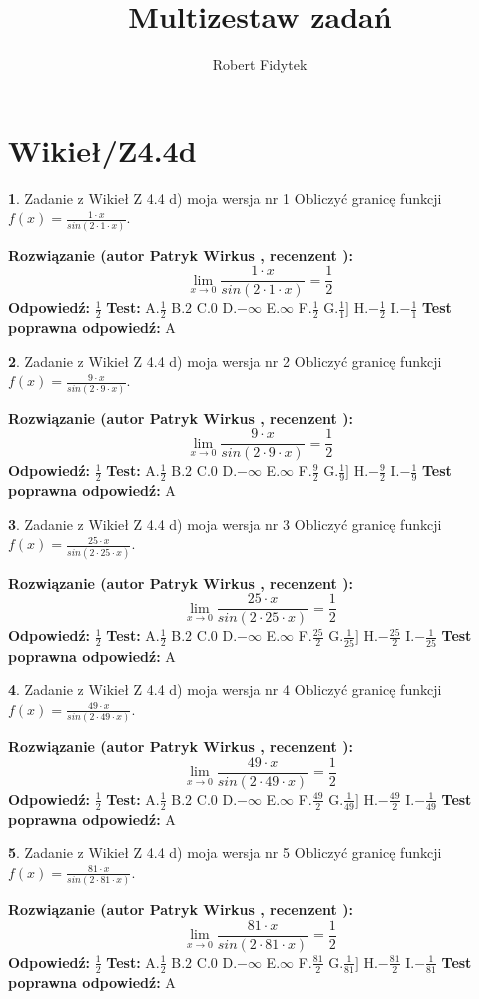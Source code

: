\documentclass[12pt, a4paper]{article}
\title{Multizestaw zadań}
\author{Robert Fidytek}
\date{}
\theoremstyle{definition} %
\newtheorem{zad}{}
\newcommand{\kategoria}[1]{\section{#1}}
\newcommand{\zadStart}[1]{\begin{zad}#1\newline}
\newcommand{\zadStop}{\end{zad}}
\newcommand{\rozwStart}[2]{\noindent \textbf{Rozwiązanie (autor #1 , recenzent #2): }\newline}
\newcommand{\rozwStop}{\newline}
\newcommand{\odpStart}{\noindent \textbf{Odpowiedź:}\newline}
\newcommand{\odpStop}{\newline}
\newcommand{\testStart}{\noindent \textbf{Test:}\newline}
\newcommand{\testStop}{\newline}
\newcommand{\kluczStart}{\noindent \textbf{Test poprawna odpowiedź:}\newline}
\newcommand{\kluczStop}{\newline}
\begin{document}
\maketitle

\kategoria{Wikieł/Z4.4d}


\zadStart{Zadanie z Wikieł Z 4.4 d) moja wersja nr 1}
Obliczyć granicę funkcji $f(x)=\frac{1\cdot x}{sin(2 \cdot1\cdot x)}$.
\zadStop
\rozwStart{Patryk Wirkus}{}
$$\lim\limits_{x\to 0}\frac{1\cdot x}{sin(2 \cdot1\cdot x)}=\frac{1}{2}$$
\rozwStop
\odpStart
$\frac{1}{2}$
\odpStop
\testStart
A.$\frac{1}{2}$
B.$2$
C.$0$
D.$-\infty$
E.$\infty$
F.$\frac{1}{2}$
G.$\frac{1}{1}]$
H.$-\frac{1}{2}$
I.$-\frac{1}{1}$
\testStop
\kluczStart
A
\kluczStop



\zadStart{Zadanie z Wikieł Z 4.4 d) moja wersja nr 2}
Obliczyć granicę funkcji $f(x)=\frac{9\cdot x}{sin(2 \cdot9\cdot x)}$.
\zadStop
\rozwStart{Patryk Wirkus}{}
$$\lim\limits_{x\to 0}\frac{9\cdot x}{sin(2 \cdot9\cdot x)}=\frac{1}{2}$$
\rozwStop
\odpStart
$\frac{1}{2}$
\odpStop
\testStart
A.$\frac{1}{2}$
B.$2$
C.$0$
D.$-\infty$
E.$\infty$
F.$\frac{9}{2}$
G.$\frac{1}{9}]$
H.$-\frac{9}{2}$
I.$-\frac{1}{9}$
\testStop
\kluczStart
A
\kluczStop



\zadStart{Zadanie z Wikieł Z 4.4 d) moja wersja nr 3}
Obliczyć granicę funkcji $f(x)=\frac{25\cdot x}{sin(2 \cdot25\cdot x)}$.
\zadStop
\rozwStart{Patryk Wirkus}{}
$$\lim\limits_{x\to 0}\frac{25\cdot x}{sin(2 \cdot25\cdot x)}=\frac{1}{2}$$
\rozwStop
\odpStart
$\frac{1}{2}$
\odpStop
\testStart
A.$\frac{1}{2}$
B.$2$
C.$0$
D.$-\infty$
E.$\infty$
F.$\frac{25}{2}$
G.$\frac{1}{25}]$
H.$-\frac{25}{2}$
I.$-\frac{1}{25}$
\testStop
\kluczStart
A
\kluczStop



\zadStart{Zadanie z Wikieł Z 4.4 d) moja wersja nr 4}
Obliczyć granicę funkcji $f(x)=\frac{49\cdot x}{sin(2 \cdot49\cdot x)}$.
\zadStop
\rozwStart{Patryk Wirkus}{}
$$\lim\limits_{x\to 0}\frac{49\cdot x}{sin(2 \cdot49\cdot x)}=\frac{1}{2}$$
\rozwStop
\odpStart
$\frac{1}{2}$
\odpStop
\testStart
A.$\frac{1}{2}$
B.$2$
C.$0$
D.$-\infty$
E.$\infty$
F.$\frac{49}{2}$
G.$\frac{1}{49}]$
H.$-\frac{49}{2}$
I.$-\frac{1}{49}$
\testStop
\kluczStart
A
\kluczStop



\zadStart{Zadanie z Wikieł Z 4.4 d) moja wersja nr 5}
Obliczyć granicę funkcji $f(x)=\frac{81\cdot x}{sin(2 \cdot81\cdot x)}$.
\zadStop
\rozwStart{Patryk Wirkus}{}
$$\lim\limits_{x\to 0}\frac{81\cdot x}{sin(2 \cdot81\cdot x)}=\frac{1}{2}$$
\rozwStop
\odpStart
$\frac{1}{2}$
\odpStop
\testStart
A.$\frac{1}{2}$
B.$2$
C.$0$
D.$-\infty$
E.$\infty$
F.$\frac{81}{2}$
G.$\frac{1}{81}]$
H.$-\frac{81}{2}$
I.$-\frac{1}{81}$
\testStop
\kluczStart
A
\kluczStop
\end{document}

